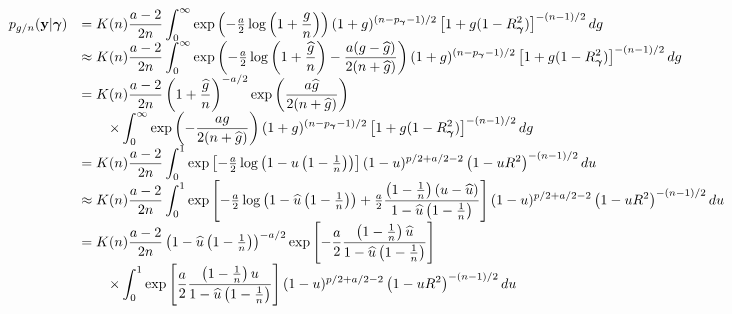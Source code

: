 $$
\begin{array}{rl}
p_{g/n}({\bf y}|{\boldsymbol \gamma}) 
& \displaystyle = K(n) \frac{a - 2}{2n}  \int_0^\infty 
\exp\left( -\tfrac{a}{2} \log\left(1 + \frac{g}{n}\right) \right)
(1 + g)^{(n-p_{\boldsymbol \gamma}-1)/2} \left[ 1 + g (1 - R_{\boldsymbol \gamma}^2) \right]^{-(n-1)/2}  dg
\\
& \displaystyle \approx K(n) \frac{a - 2}{2n}  \int_0^\infty 
\exp\left( -\tfrac{a}{2} \log\left(1 + \frac{\widehat{g}}{n}\right) - \frac{a(g - \widehat{g})}{2(n + \widehat{g})} \right)
(1 + g)^{(n-p_{\boldsymbol \gamma}-1)/2} \left[ 1 + g (1 - R_{\boldsymbol \gamma}^2) \right]^{-(n-1)/2}  dg
\\
& \displaystyle = K(n) \frac{a - 2}{2n} \left( 1 + \frac{\widehat{g}}{n} \right)^{-a/2} \exp\left( \frac{a\widehat{g}}{2(n + \widehat{g})} \right) \\
& \displaystyle \qquad \times \int_0^\infty 
\exp\left(  - \frac{ag}{2(n + \widehat{g})} \right)
(1 + g)^{(n-p_{\boldsymbol \gamma}-1)/2} \left[ 1 + g (1 - R_{\boldsymbol \gamma}^2) \right]^{-(n-1)/2}  dg
\\
& \displaystyle = K(n) \frac{a - 2}{2n}  \int_0^1 \exp\left[
- \tfrac{a}{2}\log\left(  1 - u \left(1  -  \tfrac{1}{n} \right) \right)
\right]
(1 - u)^{p/2 + a/2 - 2  }   \left(  1 - u R^2\right)^{-(n-1)/2} du
\\
& \displaystyle \approx K(n) \frac{a - 2}{2n}  \int_0^1 \exp\left[
- \tfrac{a}{2}\log\left(  1 - \widehat{u} \left(1  -  \tfrac{1}{n} \right)  \right) + \tfrac{a}{2} \frac{\left(1  -  \tfrac{1}{n} \right)(u - \widehat{u})}{1 - \widehat{u} \left(1  -  \tfrac{1}{n} \right)}
\right]
(1 - u)^{p/2 + a/2 - 2  }   \left(  1 - u R^2\right)^{-(n-1)/2} du
\\
& \displaystyle = K(n) \frac{a - 2}{2n} \left(  1 - \widehat{u} \left(1  -  \tfrac{1}{n} \right)  \right)^{-a/2} 
\exp\left[
-\frac{a}{2} \frac{\left(1  -  \tfrac{1}{n} \right)\widehat{u}}{1 - \widehat{u} \left(1  -  \tfrac{1}{n} \right)}
\right]\\
& \displaystyle \qquad \times \int_0^1 \exp\left[
\frac{a}{2} \frac{\left(1  -  \tfrac{1}{n} \right)u}{1 - \widehat{u} \left(1  -  \tfrac{1}{n} \right)}
\right]
(1 - u)^{p/2 + a/2 - 2  }   \left(  1 - u R^2\right)^{-(n-1)/2} du
\end{array} 
$$


